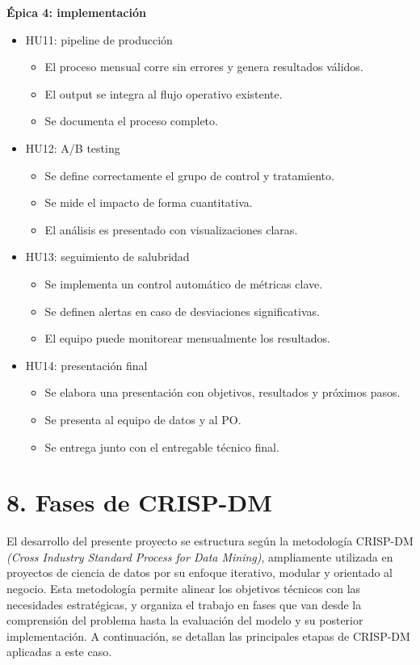 \documentclass[
11pt, %
]{charter}
\begin{document}
\textbf{\'Epica 4: implementación}
\begin{itemize}
  \item HU11: pipeline de producción
  \begin{itemize}
    \item El proceso mensual corre sin errores y genera resultados válidos.
    \item El output se integra al flujo operativo existente.
    \item Se documenta el proceso completo.
  \end{itemize}
  \item HU12: A/B testing
  \begin{itemize}
    \item Se define correctamente el grupo de control y tratamiento.
    \item Se mide el impacto de forma cuantitativa.
    \item El análisis es presentado con visualizaciones claras.
  \end{itemize}
  \item HU13: seguimiento de salubridad
  \begin{itemize}
    \item Se implementa un control automático de métricas clave.
    \item Se definen alertas en caso de desviaciones significativas.
    \item El equipo puede monitorear mensualmente los resultados.
  \end{itemize}
  \item HU14: presentación final
  \begin{itemize}
    \item Se elabora una presentación con objetivos, resultados y próximos pasos.
    \item Se presenta al equipo de datos y al PO.
    \item Se entrega junto con el entregable técnico final.
  \end{itemize}
\end{itemize}

\section{8. Fases de CRISP-DM}

El desarrollo del presente proyecto se estructura según la metodología CRISP-DM  \textit{(Cross Industry Standard Process for Data Mining)}, ampliamente utilizada en proyectos de ciencia de datos por su enfoque iterativo, modular y orientado al negocio. Esta metodología permite alinear los objetivos técnicos con las necesidades estratégicas, y organiza el trabajo en fases que van desde la comprensión del problema hasta la evaluación del modelo y su posterior implementación. A continuación, se detallan las principales etapas de CRISP-DM aplicadas a este caso.
\end{document}
